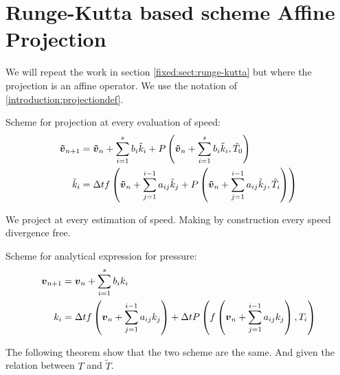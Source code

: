 \section{Runge-Kutta based scheme Affine Projection}
\label{fixed:sect:runge-kutta:affine}
We will repeat the work in section \ref{fixed:sect:runge-kutta} but where the projection is an affine operator.
We use the notation of \ref{introduction:projectiondef}.

Scheme for projection at every evaluation of speed:
\begin{subequations}
\begin{align}
{\boldsymbol {\tilde{v}}}_{n+1}&={\boldsymbol {\tilde{v}}}_{n}+\sum_{i=1}^{s}b_{i}\tilde{k}_{i}+P\left({\boldsymbol {\tilde{v}}}_{n}+\sum_{i=1}^{s}b_{i}\tilde{k}_{i},\tilde{T}_0\right)\\
\tilde{k}_{i}&=\Delta t f\left({\boldsymbol {\tilde{v}}}_{n}+\sum_{j=1}^{i-1}a_{ij}\tilde{k}_{j}+P\left({\boldsymbol {\tilde{v}}}_{n}+\sum_{j=1}^{i-1}a_{ij}\tilde{k}_{j},\tilde{T}_i\right)\right)
\end{align}
\end{subequations}

We project at every estimation of speed. Making by construction every speed divergence free.

Scheme for analytical expression for pressure:
\begin{subequations}
\begin{align}
	{\boldsymbol {v}}_{n+1}&={\boldsymbol {v}}_{n}+\sum_{i=1}^{s}b_{i}k_{i}\\
	k_{i}&=\Delta t f\left({\boldsymbol {v}}_{n}+\sum_{j=1}^{i-1}a_{ij}k_{j}\right)+\Delta t P\left(f\left({\boldsymbol {v}}_{n}+\sum_{j=1}^{i-1}a_{ij}k_{j}\right),T_{i}\right)
\end{align}
\end{subequations}

The following theorem show that the two scheme are the same. And given the relation between $T$ and $\tilde{T}$.

